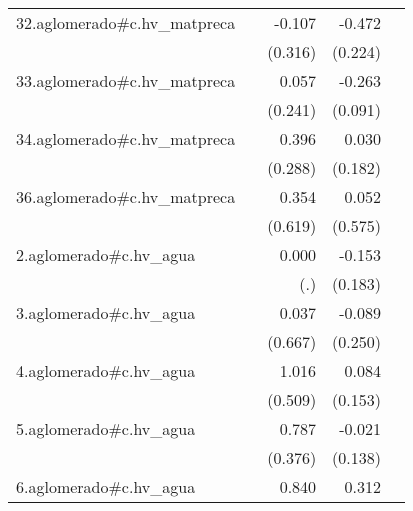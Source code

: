 {\begin{longtable}{l*{4}{D{.}{.}{-1}}}
\addlinespace
32.aglomerado#c.hv\_matpreca&                     &      -0.107         &      -0.472\sym{*}  &                     \\
            &                     &     (0.316)         &     (0.224)         &                     \\
\addlinespace
33.aglomerado#c.hv\_matpreca&                     &       0.057         &      -0.263\sym{**} &                     \\
            &                     &     (0.241)         &     (0.091)         &                     \\
\addlinespace
34.aglomerado#c.hv\_matpreca&                     &       0.396         &       0.030         &                     \\
            &                     &     (0.288)         &     (0.182)         &                     \\
\addlinespace
36.aglomerado#c.hv\_matpreca&                     &       0.354         &       0.052         &                     \\
            &                     &     (0.619)         &     (0.575)         &                     \\
\addlinespace
2.aglomerado#c.hv\_agua&                     &       0.000         &      -0.153         &                     \\
            &                     &         (.)         &     (0.183)         &                     \\
\addlinespace
3.aglomerado#c.hv\_agua&                     &       0.037         &      -0.089         &                     \\
            &                     &     (0.667)         &     (0.250)         &                     \\
\addlinespace
4.aglomerado#c.hv\_agua&                     &       1.016\sym{*}  &       0.084         &                     \\
            &                     &     (0.509)         &     (0.153)         &                     \\
\addlinespace
5.aglomerado#c.hv\_agua&                     &       0.787\sym{*}  &      -0.021         &                     \\
            &                     &     (0.376)         &     (0.138)         &                     \\
\addlinespace
6.aglomerado#c.hv\_agua&                     &       0.840         &       0.312         &                     \\

\end{longtable}}
